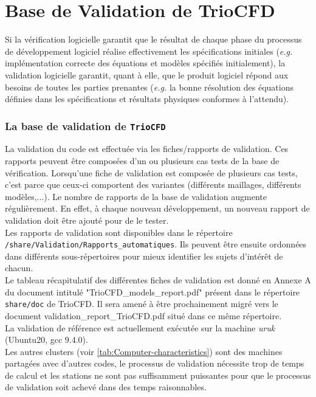 
\chapter{\label{chapitre:validation}Base de Validation de TrioCFD}
Si la v\'erification logicielle garantit que le r\'esultat de chaque phase du processus de d\'eveloppement logiciel r\'ealise effectivement les sp\'ecifications initiales (\textit{e.g.} impl\'ementation correcte des \'equations et mod\`eles sp\'ecifi\'es initialement), la validation logicielle garantit, quant \`a elle, que le produit logiciel r\'epond aux besoins de toutes les parties prenantes (\textit{e.g.} la bonne r\'esolution des \'equations d\'efinies dans les sp\'ecifications et r\'esultats physiques conformes \`a l'attendu).

\subsection{La base de validation de \texttt{TrioCFD}}

La validation du code est effectuée via les fiches/rapports de validation.
Ces rapports peuvent être composées d'un ou plusieurs cas tests de la base de vérification.
Lorsqu'une fiche de validation est composée de plusieurs cas tests, c'est parce que ceux-ci comportent des variantes (différents maillages, différents modèles,...).
Le nombre de rapports de la base de validation augmente r\'eguli\`erement.
En effet, \`a chaque nouveau d\'eveloppement, un nouveau rapport de validation doit \^etre ajout\'e pour de le tester.\\
Les rapports de validation sont disponibles dans le répertoire \texttt{/share/Validation/Rapports\_automatiques}.
Ils peuvent être ensuite ordonnées dans différents sous-répertoires pour mieux identifier les sujets d'intérêt de chacun.\\

Le tableau récapitulatif des différentes fiches de validation est donné en Annexe A du document intitulé "TrioCFD\_models\_report.pdf" présent dans le répertoire \texttt{share/doc} de TrioCFD.
Il sera amené à être prochainement migré vers le document validation\_report\_TrioCFD.pdf situé dans ce même répertoire.\\

La validation de r\'ef\'erence est actuellement exécutée sur la machine \emph{uruk} (Ubuntu20, gcc 9.4.0).\\
Les autres clusters (voir \ref{tab:Computer-characteristics}) sont des machines partagées avec d'autres codes,
le processus de validation nécessite trop de temps de calcul et les stations ne sont pas suffisamment puissantes
pour que le processus de validation soit achevé dans des temps raisonnables.\\

